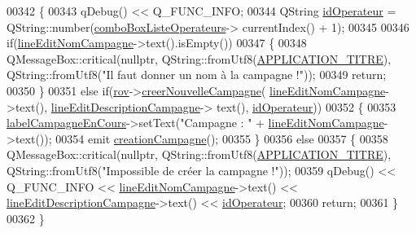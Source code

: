 \begin{DoxyCode}
00342 \{   
00343     qDebug() << Q\_FUNC\_INFO;
00344     QString \hyperlink{class_i_h_m_rov_a110af5c174e9fbba12bffbe0301ed690}{idOperateur} = QString::number(\hyperlink{class_i_h_m_rov_a32ee4423982fa3a78e59167ed2354f6e}{comboBoxListeOperateurs}->
      currentIndex() + 1);
00345 
00346     \textcolor{keywordflow}{if}(\hyperlink{class_i_h_m_rov_a3b3dac7166ab414832dea0b5ad1a570d}{lineEditNomCampagne}->text().isEmpty())
00347     \{
00348         QMessageBox::critical(\textcolor{keyword}{nullptr}, QString::fromUtf8(\hyperlink{ihmrov_8h_ab599af93fd63f0c5df05b03aa7448eb9}{APPLICATION\_TITRE}), 
      QString::fromUtf8(\textcolor{stringliteral}{"Il faut donner un nom à la campagne !"}));
00349         \textcolor{keywordflow}{return};
00350     \}
00351     \textcolor{keywordflow}{else} \textcolor{keywordflow}{if}(\hyperlink{class_i_h_m_rov_a777ca33fdb295ba6b6773e880356fa1e}{rov}->\hyperlink{class_rov_ae1306036b067e9ad50a09f9dd607a092}{creerNouvelleCampagne}(
      \hyperlink{class_i_h_m_rov_a3b3dac7166ab414832dea0b5ad1a570d}{lineEditNomCampagne}->text(), \hyperlink{class_i_h_m_rov_aedf9fd0d893326f970aa1b73dbe06e85}{lineEditDescriptionCampagne}->
      text(), \hyperlink{class_i_h_m_rov_a110af5c174e9fbba12bffbe0301ed690}{idOperateur}))
00352     \{
00353         \hyperlink{class_i_h_m_rov_a14aa781bc1a446ba6b3ecdea029caa91}{labelCampagneEnCours}->setText(\textcolor{stringliteral}{"Campagne : "} + 
      \hyperlink{class_i_h_m_rov_a3b3dac7166ab414832dea0b5ad1a570d}{lineEditNomCampagne}->text());
00354         emit \hyperlink{class_i_h_m_rov_a4a4a90ab6d074aa54466f3f87db2f81c}{creationCampagne}();
00355     \}
00356     \textcolor{keywordflow}{else}
00357     \{
00358         QMessageBox::critical(\textcolor{keyword}{nullptr}, QString::fromUtf8(\hyperlink{ihmrov_8h_ab599af93fd63f0c5df05b03aa7448eb9}{APPLICATION\_TITRE}), 
      QString::fromUtf8(\textcolor{stringliteral}{"Impossible de créer la campagne !"}));
00359         qDebug() << Q\_FUNC\_INFO << \hyperlink{class_i_h_m_rov_a3b3dac7166ab414832dea0b5ad1a570d}{lineEditNomCampagne}->text() << 
      \hyperlink{class_i_h_m_rov_aedf9fd0d893326f970aa1b73dbe06e85}{lineEditDescriptionCampagne}->text() << \hyperlink{class_i_h_m_rov_a110af5c174e9fbba12bffbe0301ed690}{idOperateur};
00360         \textcolor{keywordflow}{return};
00361     \}
00362 \}
\end{DoxyCode}
\mbox{\label{class_i_h_m_rov_a8931cade7a1613975da7174b5c2e84d2}} 
